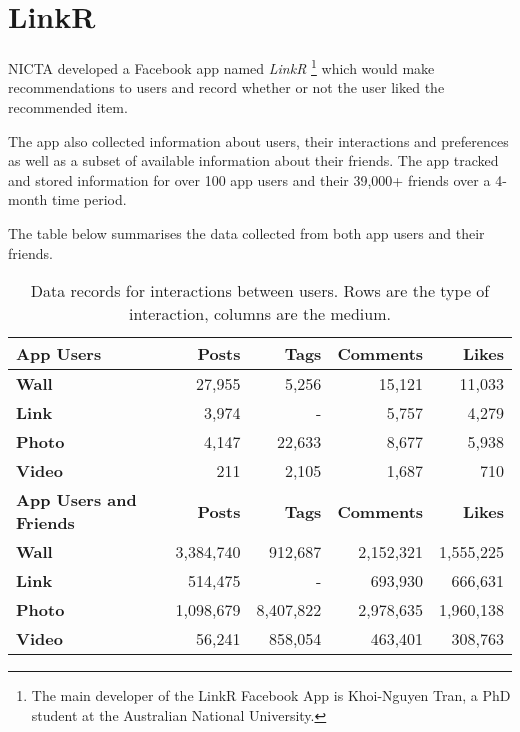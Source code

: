 
\section{LinkR}
\label{sec:linkr}

NICTA developed a Facebook app named \emph{LinkR} \footnote{The main developer of the LinkR Facebook App is Khoi-Nguyen Tran, 
a PhD student at the Australian National University.} which would make recommendations to users and record whether or not the 
user liked the recommended item.

The app also collected information about users, their interactions and preferences as well as a subset of available information about 
their friends. The app tracked and stored information for over 100 app users and their 39,000+ friends over a 4-month time period.

The table below summarises the data collected from both app users and their friends.

\begin{table}[!htbp]
\centering
	\begin{tabular}{|l|r|r|r|r|} %
		\hline
		\textbf{App Users} & \textbf{Posts} & \textbf{Tags} & \textbf{Comments} & \textbf{Likes}  \\ \hline
		\textbf{Wall} & 27,955 & 5,256 & 15,121 & 11,033 \\ \hline
		\textbf{Link} & 3,974 & - & 5,757 & 4,279 \\ \hline
		\textbf{Photo} & 4,147 & 22,633 & 8,677 & 5,938 \\ \hline
		\textbf{Video} & 211 & 2,105 & 1,687 & 710 \\ \hline
		 \hline
		\textbf{App Users and Friends} & \textbf{Posts} & \textbf{Tags} & \textbf{Comments} & \textbf{Likes}  \\ \hline
		\textbf{Wall} & 3,384,740 & 912,687 & 2,152,321 & 1,555,225 \\ \hline
		\textbf{Link} & 514,475 & - & 693,930 & 666,631 \\ \hline
		\textbf{Photo} & 1,098,679 & 8,407,822 & 2,978,635 & 1,960,138 \\ \hline
		\textbf{Video} & 56,241 & 858,054 & 463,401 & 308,763 \\ \hline
	\end{tabular}
	\caption{Data records for interactions between users. Rows are the type of interaction, columns are the medium.}
	\label{tab:revpol}
\end{table}


